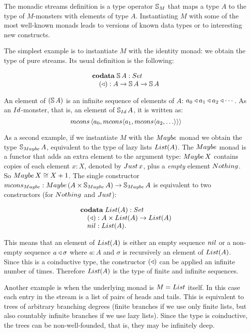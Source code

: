 The monadic streams definition is a type operator $\mathbb{S}_{M}$ that maps a type $A$ to the type of $M$-monsters with elements of type $A$.
Instantiating $M$ with some of the most well-known monads leads to versions of known data types or to interesting new constructs.

The simplest example is to instantiate $M$ with the identity monad: we obtain the type of pure streams.
Its usual definition is the following:

$$
\begin{array}[t]{l}
\codata\;
\strsym\,A:\set\\
\quad (\scons): A\rightarrow \strsym\,A \rightarrow\strsym\,A
\end{array}
$$

An element of $(\mathbb{S}\,A)$ is an infinite sequence of elements of $A$: $a_0 \triangleleft a_1\triangleleft a_2\triangleleft \cdots$.
As an $\Id$-monster, that is, an element of $\stream{\Id}\,A$, it is written as:
$$
\mcons\,\langle a_0,\mcons \langle a_1, \mcons \langle a_2, \ldots \rangle \rangle \rangle
$$

As a second example, if we instantiate $M$ with the $\maybe$ monad we obtain the type $\stream{\maybe}\,A$, equivalent to the type of lazy lists $\lst{A}$.
The $\maybe$ monad is a functor that adds an extra element to the argument type:
$\maybe\,X$ contains copies of each element $x:X$, denoted by $\just\,x$, plus a {\em empty} element $\nothing$.
So $\maybe\,X \cong X+1$.
The single constructor $\mcons_\maybe: \maybe\,(A\times \stream{\maybe}\,A)\rightarrow\stream{\maybe}\,A$ is equivalent to two constructors (for $\nothing$ and $\just$):

$$
\begin{array}[t]{l}
\codata\;
\lst{A}:\set\\
\quad (\scons): A\times \lst{A}\rightarrow\lst{A}\\
\quad \nil: \lst{A}.
\end{array}
$$

This means that an element of $\lst{A}$ is either an empty sequence $\nil$ or a non-empty sequence $a\triangleleft \sigma$ where $a:A$ and $\sigma$ is recursively an element of $\lst{A}$.
Since this is a coinductive type, the constructor $(\triangleleft)$ can be applied an infinite number of times.
Therefore $\lst{A}$ is the type of finite and infinite sequences.

Another example is when the underlying monad is $M = \lstsym $ itself.
In this case each entry in the stream is a list of pairs of heads and tails.
This is equivalent to trees of arbitrary branching degrees (finite branches if we use only finite lists, but also countably infinite branches if we use lazy lists).
Since the type is coinductive, the trees can be non-well-founded, that is, they may be infinitely deep.

